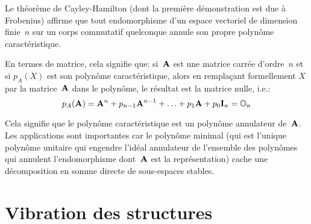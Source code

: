 \begin{remarque}
Le théorème de Cayley-Hamilton (dont la première démonstration est due à Frobenius) affirme que tout endomorphisme d'un espace vectoriel de dimension finie~$n$ sur un corps commutatif quelconque annule son propre polynôme caractéristique.

En termes de matrice, cela signifie que: si~$\MM{A}$ est une matrice carrée d'ordre~$n$ et si $p_A(X)$ est son polynôme caractéristique, alors en remplaçant formellement $X$ par la matrice~$\MM{A}$ dans le polynôme, le résultat est la matrice nulle, i.e.:
\begin{equation}p_A(\MM{A})= \MM{A}^n + p_{n-1}\MM{A}^{n-1} + \ldots + p_1 \MM{A} + p_0 \MM{I}_n = \MM{\mO}_n \end{equation}

Cela signifie que le polynôme caractéristique est un
polynôme annulateur de~$\MM{A}$. Les applications sont importantes car le polynôme minimal (qui est l'unique polynôme unitaire qui engendre l'idéal annulateur de l'ensemble des polynômes qui annulent l'endomorphisme dont~$\MM{A}$ est la représentation) cache une décomposition en somme directe de sous-espaces stables.
\end{remarque}








\medskip
\section{Vibration des structures}

